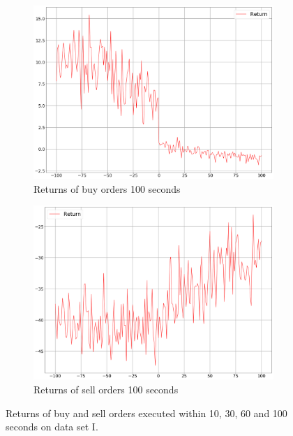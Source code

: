 \begin{figure}[H]
\begin{subfigure}[b]{0.45\textwidth}
        \includegraphics[width=\textwidth]{images/behaviour-100s-buy.png}
        \caption{Returns of buy orders 100 seconds}
        \label{fig:behvaiour-down-100s-buy}
    \end{subfigure}
    \begin{subfigure}[b]{0.45\textwidth}
        \includegraphics[width=\textwidth]{images/behaviour-100s-sell.png}
        \caption{Returns of sell orders 100 seconds}
        \label{fig:behvaiour-down-100s-sell}
    \end{subfigure}
    \caption{Returns of buy and sell orders executed within 10, 30, 60 and 100 seconds on data set I.}
    \label{fig:behvaiour-down}
\end{figure}

